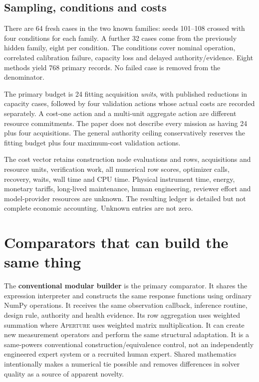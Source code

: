 \documentclass[11pt,letterpaper]{article}
\newcommand{\ap}{\textsc{Aperture}}
\begin{document}
\subsection{Sampling, conditions and costs}

There are 64 fresh cases in the two known families: seeds 101--108 crossed with four conditions for each family. A further 32 cases come from the previously hidden family, eight per condition. The conditions cover nominal operation, correlated calibration failure, capacity loss and delayed authority/evidence. Eight methods yield 768 primary records. No failed case is removed from the denominator.

The primary budget is 24 fitting acquisition \emph{units}, with published reductions in capacity cases, followed by four validation actions whose actual costs are recorded separately. A cost-one action and a multi-unit aggregate action are different resource commitments. The paper does not describe every mission as having 24 plus four acquisitions. The general authority ceiling conservatively reserves the fitting budget plus four maximum-cost validation actions.

The cost vector retains construction node evaluations and rows, acquisitions and resource units, verification work, all numerical row scores, optimizer calls, recovery, waits, wall time and CPU time. Physical instrument time, energy, monetary tariffs, long-lived maintenance, human engineering, reviewer effort and model-provider resources are unknown. The resulting ledger is detailed but not complete economic accounting. Unknown entries are not zero.

\section{Comparators that can build the same thing}

The \textbf{conventional modular builder} is the primary comparator. It shares the expression interpreter and constructs the same response functions using ordinary NumPy operations. It receives the same observation callback, inference routine, design rule, authority and health evidence. Its row aggregation uses weighted summation where \ap{} uses weighted matrix multiplication. It can create new measurement operators and perform the same structural adaptation. It is a same-powers conventional construction/equivalence control, not an independently engineered expert system or a recruited human expert. Shared mathematics intentionally makes a numerical tie possible and removes differences in solver quality as a source of apparent novelty.
\end{document}
